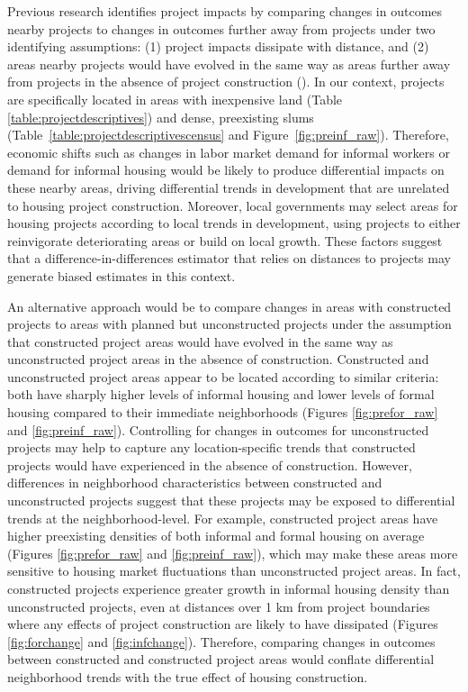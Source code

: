 \documentclass[12pt]{article}
\begin{document}
Previous research identifies project impacts by comparing changes in outcomes nearby projects to changes in outcomes further away from projects under two identifying assumptions: (1) project impacts dissipate with distance, and (2) areas nearby projects would have evolved in the same way as areas further away from projects in the absence of project construction (\cite{diamond2016wants,harari2018slum}).  In our context, projects are specifically located in areas with inexpensive land (Table \ref{table:projectdescriptives}) and dense, preexisting slums (Table~\ref{table:projectdescriptivescensus} and Figure~\ref{fig:preinf_raw}).  Therefore, economic shifts such as changes in labor market demand for informal workers or demand for informal housing would be likely to produce differential impacts on these nearby areas, driving differential trends in development that are unrelated to housing project construction.  Moreover, local governments may select areas for housing projects according to local trends in development, using projects to either reinvigorate deteriorating areas or build on local growth.  These factors suggest that a difference-in-differences estimator that relies on distances to projects may generate biased estimates in this context.

An alternative approach would be to compare changes in areas with constructed projects to areas with planned but unconstructed projects under the assumption that constructed project areas would have evolved in the same way as unconstructed project areas in the absence of construction.  Constructed and unconstructed project areas appear to be located according to similar criteria: both have sharply higher levels of informal housing and lower levels of formal housing compared to their immediate neighborhoods (Figures \ref{fig:prefor_raw} and \ref{fig:preinf_raw}).  Controlling for changes in outcomes for unconstructed projects may help to capture any location-specific trends that constructed projects would have experienced in the absence of construction.  However,  differences in neighborhood characteristics between constructed and unconstructed projects suggest that these projects may be exposed to differential trends at the neighborhood-level.  For example, constructed project areas have higher preexisting densities of both informal and formal housing on average (Figures \ref{fig:prefor_raw} and \ref{fig:preinf_raw}), which may make these areas more sensitive to housing market fluctuations than unconstructed project areas.  In fact, constructed projects experience greater growth in informal housing density than unconstructed projects, even at distances over 1 km from project boundaries where any effects of project construction are likely to have dissipated (Figures \ref{fig:forchange} and \ref{fig:infchange}).  Therefore, comparing changes in outcomes between constructed and constructed project areas would conflate differential neighborhood trends with the true effect of housing construction.
\end{document}

